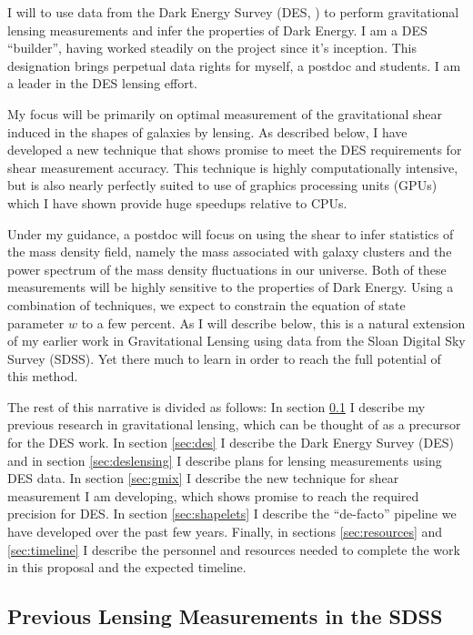 \documentclass[12pt]{article}
\begin{document}
I will to use data from the Dark Energy Survey (DES, \cite{DESWhitePaper}) to
perform gravitational lensing measurements and infer the properties of Dark
Energy.  I am a DES ``builder'', having worked steadily on the project since
it's inception.  This designation brings perpetual data rights for myself, a
postdoc and students.  I am a leader in the DES lensing effort.  

My focus will be primarily on optimal measurement of the gravitational shear
induced in the shapes of galaxies by lensing. As described below, I have
developed a new technique that shows promise to meet the DES requirements for
shear measurement accuracy.  This technique is highly computationally
intensive, but is also nearly perfectly suited to use of graphics processing
units (GPUs) which I have shown provide huge speedups relative to CPUs.

Under my guidance, a postdoc will focus on using the shear to infer statistics
of the mass density field, namely the mass associated with galaxy clusters and
the power spectrum of the mass density fluctuations in our universe. Both of
these measurements will be highly sensitive to the properties of Dark Energy.
Using a combination of techniques, we expect to constrain the equation of state
parameter $w$ to a few percent.  As I will describe below, this is a natural
extension of my earlier work in Gravitational Lensing using data from the Sloan
Digital Sky Survey (SDSS).  Yet there much to learn in order to reach the full 
potential of this method.

The rest of this narrative is divided as follows: In section \ref{sec:sdssold}
I describe my previous research in gravitational lensing, which can be thought
of as a precursor for the DES work.  In section \ref{sec:des} I describe the
Dark Energy Survey (DES) and in section \ref{sec:deslensing} I describe plans
for lensing measurements using DES data.  In section \ref{sec:gmix} I describe
the new technique for shear measurement I am developing, which shows promise to
reach the required precision for DES. In section \ref{sec:shapelets} I describe
the ``de-facto'' pipeline we have developed over the past few years.  Finally,
in sections \ref{sec:resources} and \ref{sec:timeline} I describe the personnel
and resources needed to complete the work in this proposal and the expected
timeline.


\subsection{Previous Lensing Measurements in the SDSS} \label{sec:sdssold}
\end{document}
